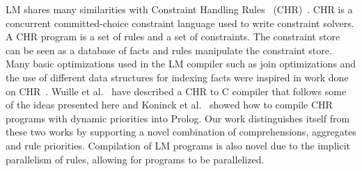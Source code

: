 
LM shares many similarities with Constraint Handling Rules~
(CHR)~\cite{Betz:2005kx,DBLP:journals/corr/abs-1006-3039}.  CHR is a concurrent
committed-choice constraint language used to write constraint solvers. A CHR
program is a set of rules and a set of constraints.  The constraint store can be
seen as a database of facts and rules manipulate the constraint store. Many
basic optimizations used in the LM compiler such as join optimizations and the
use of different data structures for indexing facts were inspired in work done
on CHR~\cite{DBLP:journals/corr/cs-PL-0408025}.  Wuille et al.~\cite{42866} have
described a CHR to C compiler that follows some of the ideas presented here and
Koninck et al.~\cite{chrp} showed how to compile CHR programs with dynamic
priorities into Prolog. Our work distinguishes itself from these two works by
supporting a novel combination of comprehensions, aggregates and rule
priorities. Compilation of LM programs is also novel due to the implicit
parallelism of rules, allowing for programs to be parallelized.
